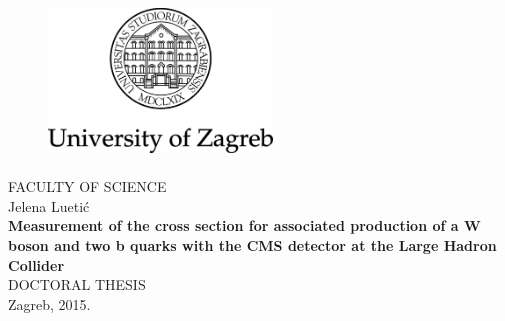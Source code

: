 \documentclass[12pt,oneside, a4paper]{book}
\begin{document}
\frontmatter

\begin{titlepage}
  \fontsize{16pt}{20pt}\selectfont
  \selectfont
  \setlength{\intextsep}{0pt plus 0pt minus 0pt}

  \begin{center}
    \begin{figure}[ht!]
      \begin{center}
        \includegraphics[height=4.1184cm, width=5.94cm]{Figures/logo_black_eng}
      \end{center}
    \end{figure}
    \vspace{0cm}
    {FACULTY OF SCIENCE} \\
    \vspace{3cm}
    Jelena Luetić \\
    \vspace{2cm}
    {\fontsize{22pt}{22pt}\selectfont\textbf{Measurement of the cross section for associated production of a W boson and two b quarks with the CMS detector at the Large Hadron Collider}} \\
    \vspace{2cm}  
    DOCTORAL THESIS \\    
    \vfill{Zagreb, 2015.}
  \end{center}
\end{titlepage}
\end{document}
